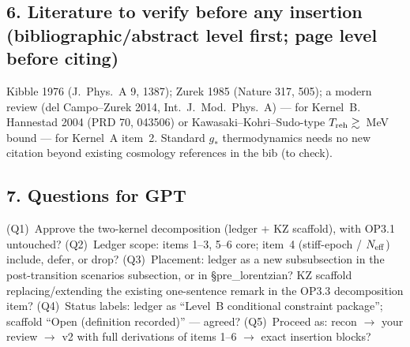 \subsection*{6. Literature to verify before any insertion
(bibliographic/abstract level first; page level before citing)}
Kibble 1976 (J.~Phys.~A 9, 1387); Zurek 1985 (Nature 317, 505);
a modern review (del Campo--Zurek 2014, Int.~J.~Mod.~Phys.~A) ---
for Kernel~B.
Hannestad 2004 (PRD 70, 043506) or Kawasaki--Kohri--Sudo-type
$T_{\rm reh}\gtrsim$~MeV bound --- for Kernel~A item~2.
Standard $g_*$ thermodynamics needs no new citation beyond
existing cosmology references in the bib (to check).

\subsection*{7. Questions for GPT}
(Q1)~Approve the two-kernel decomposition (ledger + KZ scaffold),
with OP3.1 untouched?
(Q2)~Ledger scope: items 1--3, 5--6 core; item~4 (stiff-epoch /
$N_{\rm eff}$) include, defer, or drop?
(Q3)~Placement: ledger as a new subsubsection in the
post-transition scenarios subsection, or in \S pre\_lorentzian?
KZ scaffold replacing/extending the existing one-sentence remark
in the OP3.3 decomposition item?
(Q4)~Status labels: ledger as ``Level~B conditional constraint
package''; scaffold ``Open (definition recorded)'' --- agreed?
(Q5)~Proceed as: recon $\to$ your review $\to$ v2 with full
derivations of items 1--6 $\to$ exact insertion blocks?
